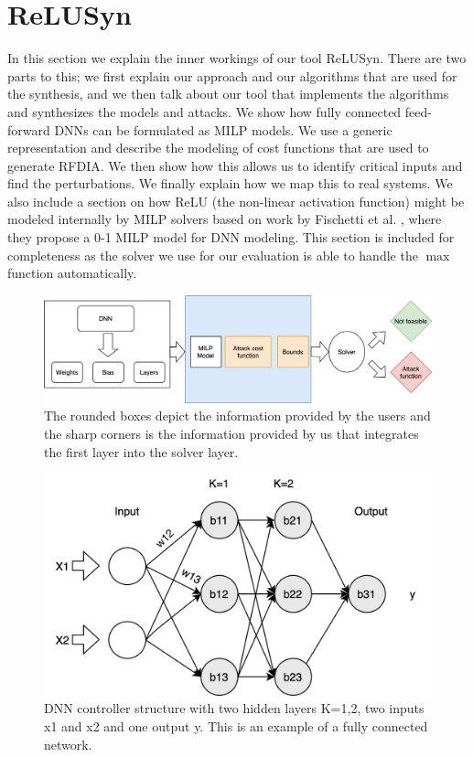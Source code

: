\chapter{ReLUSyn}
\label{relusyn}
In this section we explain the inner workings of our tool ReLUSyn. 
There are two parts to this; we first explain our approach and our algorithms that are used for the synthesis, and we then talk about our tool \tool that implements the algorithms and synthesizes the models and attacks. 
We show how fully connected feed-forward \ac{DNN}s can be formulated as \ac{MILP} models. 
We use a generic representation and describe the modeling of cost functions that are used to generate \ac{RFDIA}.
We then show how this allows us to identify critical inputs and find the perturbations. 
We finally explain how we map this to real systems.
We also include a section on how ReLU (the non-linear activation function) might be modeled internally by MILP solvers based on work by Fischetti et al. \cite{fischetti2017deep}, where they propose a 0-1 MILP model for DNN modeling.
This section is included for completeness as the solver we use for our evaluation is able to handle the $\max$ function automatically.

\begin{figure}
	\centering
	\includegraphics[scale=0.1]{Images/Methodology}
	\caption[Methodology]{The rounded boxes depict the information provided by the users and the sharp corners is the information provided by us that integrates the first layer into the solver layer.}
	\label{fig:methodology}
\end{figure}

\begin{figure}
	\centering
	\includegraphics[width=0.7\linewidth]{Images/DNNstructure}
	\caption[DNN structure]{DNN controller structure with two hidden layers K=1,2, two inputs x1 and x2 and one output y. This is an example of a fully connected network.}
	\label{fig:dnn-controller}
\end{figure}


